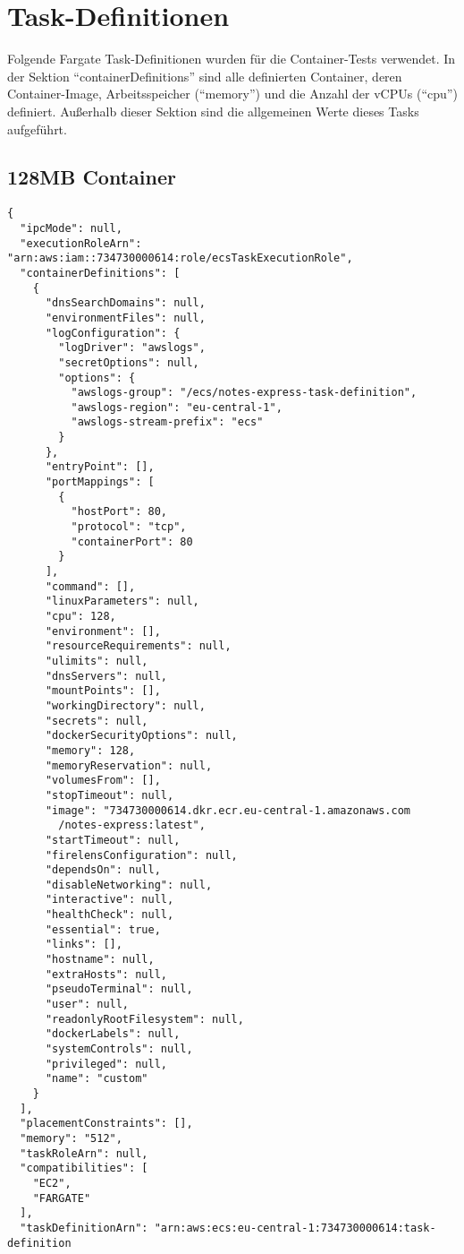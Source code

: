 \chapter{Task-Definitionen}
\label{apx:task-definitions}
Folgende Fargate Task-Definitionen wurden für die Container-Tests verwendet. In der Sektion "`containerDefinitions"' sind alle definierten Container, deren Container-Image, Arbeitsspeicher ("`memory"') und die Anzahl der vCPUs ("`cpu"') definiert. Außerhalb dieser Sektion sind die allgemeinen Werte dieses Tasks aufgeführt.

\section{128MB Container}
\begin{verbatim}
{
  "ipcMode": null,
  "executionRoleArn": "arn:aws:iam::734730000614:role/ecsTaskExecutionRole",
  "containerDefinitions": [
    {
      "dnsSearchDomains": null,
      "environmentFiles": null,
      "logConfiguration": {
        "logDriver": "awslogs",
        "secretOptions": null,
        "options": {
          "awslogs-group": "/ecs/notes-express-task-definition",
          "awslogs-region": "eu-central-1",
          "awslogs-stream-prefix": "ecs"
        }
      },
      "entryPoint": [],
      "portMappings": [
        {
          "hostPort": 80,
          "protocol": "tcp",
          "containerPort": 80
        }
      ],
      "command": [],
      "linuxParameters": null,
      "cpu": 128,
      "environment": [],
      "resourceRequirements": null,
      "ulimits": null,
      "dnsServers": null,
      "mountPoints": [],
      "workingDirectory": null,
      "secrets": null,
      "dockerSecurityOptions": null,
      "memory": 128,
      "memoryReservation": null,
      "volumesFrom": [],
      "stopTimeout": null,
      "image": "734730000614.dkr.ecr.eu-central-1.amazonaws.com
        /notes-express:latest",
      "startTimeout": null,
      "firelensConfiguration": null,
      "dependsOn": null,
      "disableNetworking": null,
      "interactive": null,
      "healthCheck": null,
      "essential": true,
      "links": [],
      "hostname": null,
      "extraHosts": null,
      "pseudoTerminal": null,
      "user": null,
      "readonlyRootFilesystem": null,
      "dockerLabels": null,
      "systemControls": null,
      "privileged": null,
      "name": "custom"
    }
  ],
  "placementConstraints": [],
  "memory": "512",
  "taskRoleArn": null,
  "compatibilities": [
    "EC2",
    "FARGATE"
  ],
  "taskDefinitionArn": "arn:aws:ecs:eu-central-1:734730000614:task-definition

\end{verbatim}
